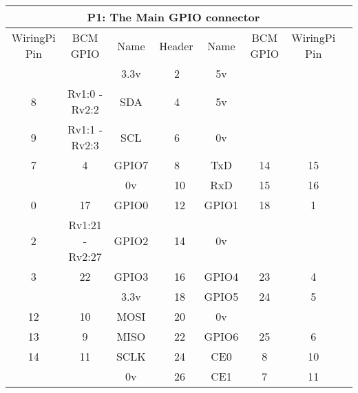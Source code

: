 \documentclass[12pt,a4paper]{article}
\begin{document}
\begin{sffamily}
\begin{center}
\begin{tabular}{|c|c|c||p{8mm}|p{8mm}||c|c|c|c|}
\hline
\multicolumn{8}{|c|}{\bfseries{P1: The Main GPIO connector}}\\
\hline
\hline
WiringPi Pin	& BCM GPIO	& Name	& \multicolumn{2}{|c||}{Header}	& Name	& BCM GPIO	& WiringPi Pin\\
\hline
\hline
	& 			& \textcolor{rtb-red}{3.3v}	& \raggedleft{1} &  2 & \textcolor{rtb-maroon}{5v}	& 	& \\
\hline
8	& Rv1:0 - Rv2:2		& \textcolor{rtb-aqua}{SDA}	& \raggedleft{\textcolor{rtb-orange}{3}} &  4 & \textcolor{rtb-maroon}{5v}	& 	& \\
\hline
9	& Rv1:1 - Rv2:3		& \textcolor{rtb-aqua}{SCL}	& \raggedleft{\textcolor{rtb-orange}{5}} &  6 & \textcolor{rtb-black}{0v}	& 	& \\
\hline
7	& 4			& \textcolor{rtb-green}{GPIO7}	& \raggedleft{\textcolor{rtb-orange}{7}} &  \textcolor{rtb-blue}{8} & \textcolor{rtb-yellow}{TxD}	& 14    & 15\\
\hline
	& 			& \textcolor{rtb-black}{0v}	& \raggedleft{9} & \textcolor{rtb-blue}{10} & \textcolor{rtb-yellow}{RxD}	& 15	& 16\\
\hline
0	& 17			& \textcolor{rtb-green}{GPIO0}	& \raggedleft{\textcolor{rtb-blue}{11}} & \textcolor{rtb-blue}{12} & \textcolor{rtb-green}{GPIO1}	& 18	& 1\\
\hline
2	& Rv1:21 - Rv2:27	& \textcolor{rtb-green}{GPIO2}	& \raggedleft{\textcolor{rtb-blue}{13}} & 14 & \textcolor{rtb-black}{0v}	& 	& \\
\hline
3	& 22			& \textcolor{rtb-green}{GPIO3}	& \raggedleft{\textcolor{rtb-blue}{15}} & \textcolor{rtb-blue}{16} & \textcolor{rtb-green}{GPIO4}	& 23	& 4\\
\hline
	& 			& \textcolor{rtb-red}{3.3v}	& \raggedleft{17} & \textcolor{rtb-blue}{18} & \textcolor{rtb-green}{GPIO5}	& 24	& 5\\
\hline
12	& 10			& \textcolor{rtb-teal}{MOSI}	& \raggedleft{\textcolor{rtb-blue}{19}} & 20 & \textcolor{rtb-black}{0v}	& 	& \\
\hline
13	& 9			& \textcolor{rtb-teal}{MISO}	& \raggedleft{\textcolor{rtb-blue}{21}} & \textcolor{rtb-blue}{22} & \textcolor{rtb-green}{GPIO6}	& 25	& 6\\
\hline
14	& 11			& \textcolor{rtb-teal}{SCLK}	& \raggedleft{\textcolor{rtb-blue}{23}} & \textcolor{rtb-orange}{24} & \textcolor{rtb-teal}{CE0}	& 8	& 10\\
\hline
	& 			& \textcolor{rtb-black}{0v}	& \raggedleft{25} & \textcolor{rtb-orange}{26}& \textcolor{rtb-teal}{CE1}	& 7	& 11\\

\end{tabular}
\end{center}
\end{sffamily}
\end{document}
